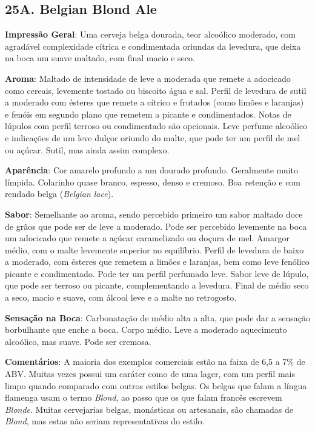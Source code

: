 \subsection*{25A. Belgian Blond Ale}
\textbf{Impressão Geral}: Uma cerveja belga dourada, teor alcoólico moderado, com agradável complexidade cítrica e condimentada oriundas da levedura, que deixa na boca um suave maltado, com final macio e seco.

\textbf{Aroma}: Maltado de intensidade de leve a moderada que remete a adocicado como cereais, levemente tostado ou biscoito água e sal. Perfil de levedura de sutil a moderado com ésteres que remete a cítrico e frutados (como limões e laranjas) e fenóis em segundo plano que remetem a picante e condimentados. Notas de lúpulos com perfil terroso ou condimentado são opcionais. Leve perfume alcoólico e indicações de um leve dulçor oriundo do malte, que pode ter um perfil de mel ou açúcar. Sutil, mas ainda assim complexo.

\textbf{Aparência}: Cor amarelo profundo a um dourado profundo. Geralmente muito límpida. Colarinho quase branco, espesso, denso e cremoso. Boa retenção e com rendado belga (\textit{Belgian lace}).

\textbf{Sabor}: Semelhante ao aroma, sendo percebido primeiro um sabor maltado doce de grãos que pode ser de leve a moderado. Pode ser percebido levemente na boca um adocicado que remete a açúcar caramelizado ou doçura de mel. Amargor médio, com o malte levemente superior no equilíbrio. Perfil de levedura de baixo a moderado, com ésteres que remetem a limões e laranjas, bem como leve fenólico picante e condimentado. Pode ter um perfil perfumado leve. Sabor leve de lúpulo, que pode ser terroso ou picante, complementando a levedura. Final de médio seco a seco, macio e suave, com álcool leve e a malte no retrogosto.

\textbf{Sensação na Boca}: Carbonatação de médio alta a alta, que pode dar a sensação borbulhante que enche a boca. Corpo médio. Leve a moderado aquecimento alcoólico, mas suave. Pode ser cremosa.

\textbf{Comentários}: A maioria dos exemplos comerciais estão na faixa de 6,5 a 7\% de ABV. Muitas vezes possui um caráter como de uma lager, com um perfil mais limpo quando comparado com outros estilos belgas. Os belgas que falam a língua flamenga usam o termo \textit{Blond}, ao passo que os que falam francês escrevem \textit{Blonde}. Muitas cervejarias belgas, monásticas ou artesanais, são chamadas de \textit{Blond}, mas estas não seriam representativas do estilo.

